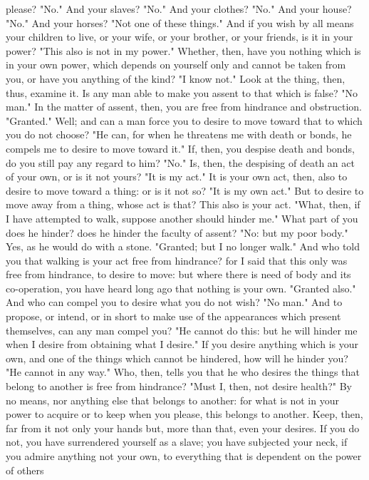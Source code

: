 \documentclass[a4paper]{article}
\begin{document}
please? "No." And your slaves? "No." And your clothes? "No." And your house?
"No." And your horses? "Not one of these things." And if you wish by all means
your children to live, or your wife, or your brother, or your friends, is it in
your power? "This also is not in my power."
    Whether, then, have you nothing which is in your own power, which depends
on yourself only and cannot be taken from you, or have you anything of the
kind? "I know not." Look at the thing, then, thus, examine it. Is any man able
to make you assent to that which is false? "No man." In the matter of assent,
then, you are free from hindrance and obstruction. "Granted." Well; and can a
man force you to desire to move toward that to which you do not choose? "He
can, for when he threatens me with death or bonds, he compels me to desire to
move toward it." If, then, you despise death and bonds, do you still pay any
regard to him? "No." Is, then, the despising of death an act of your own, or is
it not yours? "It is my act." It is your own act, then, also to desire to move
toward a thing: or is it not so? "It is my own act." But to desire to move away
from a thing, whose act is that? This also is your act. "What, then, if I have
attempted to walk, suppose another should hinder me." What part of you does he
hinder? does he hinder the faculty of assent? "No: but my poor body." Yes, as
he would do with a stone. "Granted; but I no longer walk." And who told you
that walking is your act free from hindrance? for I said that this only was
free from hindrance, to desire to move: but where there is need of body and its
co-operation, you have heard long ago that nothing is your own. "Granted also."
And who can compel you to desire what you do not wish? "No man." And to
propose, or intend, or in short to make use of the appearances which present
themselves, can any man compel you? "He cannot do this: but he will hinder me
when I desire from obtaining what I desire." If you desire anything which is
your own, and one of the things which cannot be hindered, how will he hinder
you? "He cannot in any way." Who, then, tells you that he who desires the
things that belong to another is free from hindrance?
    "Must I, then, not desire health?" By no means, nor anything else that
belongs to another: for what is not in your power to acquire or to keep when
you please, this belongs to another. Keep, then, far from it not only your
hands but, more than that, even your desires. If you do not, you have
surrendered yourself as a slave; you have subjected your neck, if you admire
anything not your own, to everything that is dependent on the power of others
\end{document}
